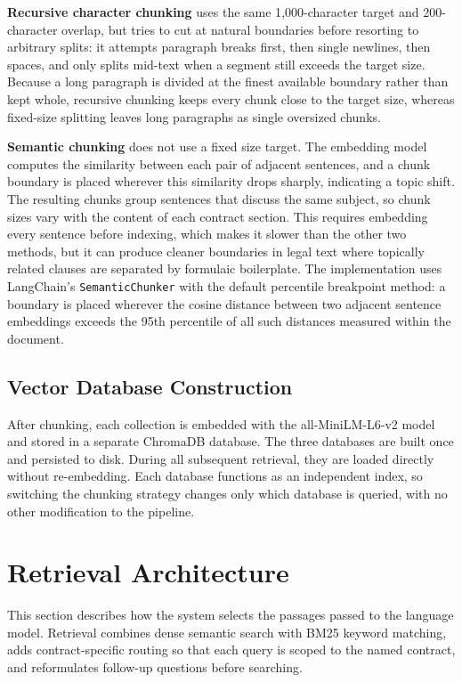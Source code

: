 \textbf{Recursive character chunking} uses the same 1{,}000-character target and 200-character overlap, but tries to cut at natural boundaries before resorting to arbitrary splits: it attempts paragraph breaks first, then single newlines, then spaces, and only splits mid-text when a segment still exceeds the target size. Because a long paragraph is divided at the finest available boundary rather than kept whole, recursive chunking keeps every chunk close to the target size, whereas fixed-size splitting leaves long paragraphs as single oversized chunks.

\textbf{Semantic chunking} does not use a fixed size target. The embedding model computes the similarity between each pair of adjacent sentences, and a chunk boundary is placed wherever this similarity drops sharply, indicating a topic shift. The resulting chunks group sentences that discuss the same subject, so chunk sizes vary with the content of each contract section. This requires embedding every sentence before indexing, which makes it slower than the other two methods, but it can produce cleaner boundaries in legal text where topically related clauses are separated by formulaic boilerplate. The implementation uses LangChain's \texttt{SemanticChunker} with the default percentile breakpoint method: a boundary is placed wherever the cosine distance between two adjacent sentence embeddings exceeds the 95th percentile of all such distances measured within the document.


\subsection{Vector Database Construction}

After chunking, each collection is embedded with the all-MiniLM-L6-v2 model and
stored in a separate ChromaDB database. The three databases are built once and
persisted to disk. During all subsequent retrieval, they are loaded directly without
re-embedding. Each database functions as an independent index, so switching the
chunking strategy changes only which database is queried, with no other modification
to the pipeline.

\section{Retrieval Architecture}

This section describes how the system selects the passages passed to the language model. Retrieval combines dense semantic search with BM25 keyword matching, adds contract-specific routing so that each query is scoped to the named contract, and reformulates follow-up questions before searching.

